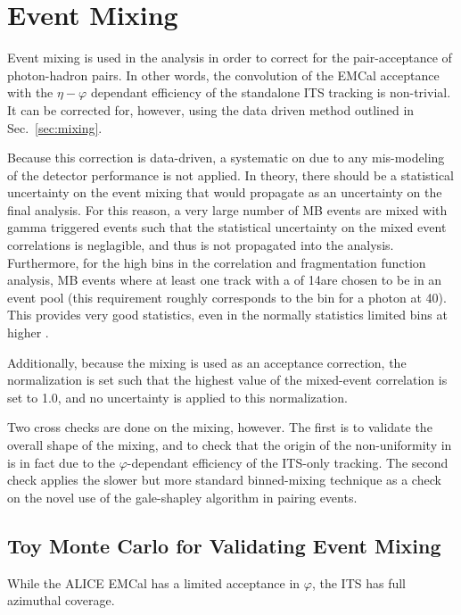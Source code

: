 \section{Event Mixing}
Event mixing is used in the analysis in order to correct for the pair-acceptance of photon-hadron pairs. In other words, the convolution of the EMCal acceptance with the $\eta-\varphi$ dependant efficiency of the standalone ITS tracking is non-trivial. It can be corrected for, however, using the data driven method outlined in Sec.~\ref{sec:mixing}.

Because this correction is data-driven, a systematic on due to any mis-modeling of the detector performance is not applied. In theory, there should be a statistical uncertainty on the event mixing that would propagate as an uncertainty on the final analysis. For this reason, a very large number of MB events are mixed with gamma triggered events such that the statistical uncertainty on the mixed event correlations is neglagible, and thus is not propagated into the analysis. Furthermore, for the high \zt bins in the correlation and fragmentation function analysis, MB events where at least one track with a \pt of 14\GeVc are chosen to be in an event pool (this \pt requirement roughly corresponds to the \zt bin for a photon at 40\GeVc). This provides very good statistics, even in the normally statistics limited bins at higher \zt.

Additionally, because the mixing is used as an acceptance correction, the normalization is set such that the highest value of the mixed-event correlation is set to 1.0, and no uncertainty is applied to this normalization.

Two cross checks are done on the mixing, however. The first is to validate the overall shape of the mixing, and to check that the origin of the non-uniformity in \deltaphi is in fact due to the $\varphi$-dependant efficiency of the ITS-only tracking. The second check applies the slower but more standard binned-mixing technique as a check on the novel use of the gale-shapley algorithm in pairing events.

\subsection{Toy Monte Carlo for Validating Event Mixing}
\label{sec:ToyMC_Mixing}

While the ALICE EMCal has a limited acceptance in $\varphi$, the ITS has full azimuthal coverage. 

